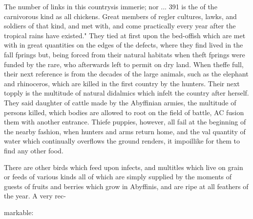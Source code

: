 The number of links in this countrysis immerie; nor ... 391 is the of the carnivorous kind as all chickens. Great members of regler cultures, lawks, and soldiers of that kind, and met with, and come practically every year after the tropical rains have existed." They tied at first upon the bed-offish which are met with in great quantities on the edges of the defects, where they find lived in the fall fprings but, being forced from their natural habitats when theft fprings were funded by the rare, who afterwards left to permit on dry land. When theffe full, their next reference is from the decades of the large animals, such as the elephant and rhinoceros, which are killed in the first country by the hunters. Their next topply is the multitude of natural didalmics which infelt the country after herself. They said daughter of cattle made by the Abyffinian armies, the multitude of persons killed, which bodies are allowed to root on the field of battle, AC fusion them with another entrance. Thiefe puppies, however, all fail at the beginning of the nearby fashion, when hunters and arms return home, and the val quantity of water which continually overflows the ground renders, it impoillike for them to find any other food.\par\medskip
There are other birds which feed upon infects, and multitles which live on grain or feeds of various kinds all of which are simply supplied by the moments of guests of fruits and berries which grow in Abyffinis, and are ripe at all feathers of the year. A very rec-\par\medskip
markable:\par\medskip
